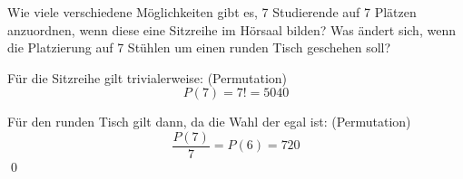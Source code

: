 \documentclass{abgabe}
\begin{document}
\begin{questions}
    \question
    Wie viele verschiedene Möglichkeiten gibt es, 7 Studierende auf 7 Plätzen anzuordnen, wenn diese eine Sitzreihe im Hörsaal bilden?
    Was ändert sich, wenn die Platzierung auf 7 Stühlen um einen runden Tisch geschehen soll?
    \begin{solution}
        Für die Sitzreihe gilt trivialerweise: (Permutation)
        \[
            P(7) = 7! = \num{5040}
        \]
        
        Für den runden Tisch gilt dann, da die Wahl der  egal ist: (Permutation)
        \[
            \frac{P(7)}{7} = P(6) = 720
        \]\qed
    \end{solution}
\end{questions}
\end{document}
